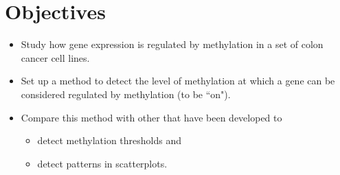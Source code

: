 \section{Objectives}

\begin{itemize}
\item Study how gene expression is regulated by methylation in a set of colon cancer cell lines.
\item Set up a method to detect the level of methylation at which a gene can be considered regulated by methylation (to be ``on").
\item Compare this method with other that have been developed to
  \begin{itemize}
  \item detect methylation thresholds and
  \item detect patterns in scatterplots.
  \end{itemize} 
\end{itemize} 
